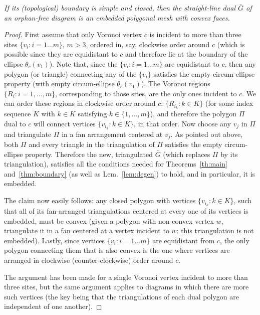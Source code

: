 \documentclass[11pt]{article}
\begin{document}
\emph{
If its (topological) boundary is simple and closed, then the straight-line dual $\bar{G}$ of an orphan-free diagram is an  embedded polygonal mesh with convex faces. 
}
\begin{proof}
	First assume that only Voronoi vertex $c$ is incident to more than three sites $\{v_i : i=1\dots m\}$, $m>3$, ordered in, say, clockwise order around $c$ (which is possible since they are equidistant to $c$ and therefore 
	lie at the boundary of the ellipse $\theta_c(v_1)$). 
	Note that, since the $\{v_i : i=1\dots m\}$ are equidistant to $c$, then any polygon (or triangle) connecting any of the $\{v_i\}$ 
		satisfies the empty circum-ellipse property (with empty circum-ellipse $\theta_c(v_1)$).  
	The  Voronoi regions $\{R_i : i=1,\dots,m\}$, corresponding to those sites, are the only ones incident to $c$. 
	We can order these regions in clockwise order around $c$: $\{R_{i_k} : k\in K\}$ 
	(for some index sequence $K$ with $k\in K$ satisfying $k\in\{1,\dots,m\}$), 
	and therefore the polygon $\Pi$ dual to $c$ will connect vertices $\{v_{i_k} : k\in K\}$, in that order. 
	Now choose any $v_j$ in $\Pi$ and triangulate $\Pi$ in a fan arrangement centered at $v_j$. 
	As pointed out above, both $\Pi$ and every triangle in the triangulation of $\Pi$ satisfies the empty circum-ellipse property. 
	Therefore the new, triangulated $\bar{G}$ (which replaces $\Pi$ by its triangulation), 
	satisfies all the conditions needed for Theorems~\ref{th:main} and~\ref{thm:boundary} (as well as Lem.~\ref{lem:degen}) to hold, 
	and in particular, it is embedded. 


	The claim now easily follows: any closed polygon with vertices $\{v_{i_k} : k\in K\}$, 
		such that all of its fan-arranged triangulations centered at every one of its vertices is embedded, must be convex 
		(given a polygon with non-convex vertex $w$, triangulate it in a fan centered at a vertex incident to $w$: this triangulation is not embedded). 
	Lastly, since vertices $\{v_i : i=1\dots m\}$ are equidistant from $c$, the only polygon connecting them 
		that is also convex is the one where vertices are arranged in clockwise (counter-clockwise) order around $c$. 

The argument has been made for a single Voronoi vertex incident to more than three sites, but the same argument applies to diagrams in which there are more such vertices 
	(the key being that the triangulations of each dual polygon are independent of one another). 
\end{proof}
\end{document}
